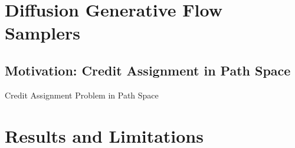 \documentclass[aspectratio=169,xcolor=dvipsnames]{beamer}
\begin{document}






\section{Diffusion Generative Flow Samplers}

\subsection{Motivation: Credit Assignment in Path Space}

\begin{frame}[t]{Credit Assignment Problem in Path Space}
\footnotesize

\end{frame}


\section{Results and Limitations}
\end{document}
